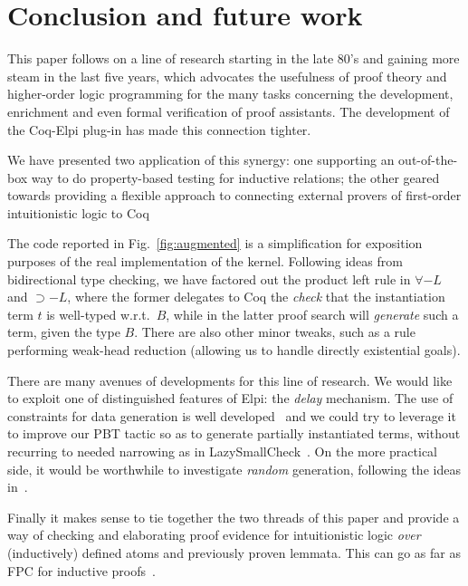 \section{Conclusion and future work}

This paper follows on a line of research starting in the late 80's and
gaining more steam in the last five years, which advocates the
usefulness of proof theory and higher-order logic programming for the
many tasks concerning the development, enrichment and even formal
verification of proof assistants. The development of the Coq-Elpi
plug-in has made this connection tighter.

We have presented two application of this synergy: one supporting an
out-of-the-box way to do property-based testing for inductive
relations; the other geared towards providing a flexible approach to
connecting external provers of first-order intuitionistic logic to Coq
%


 The
code reported in Fig.~\ref{fig:augmented} is a simplification for
exposition purposes of the real implementation of the
kernel. Following ideas from bidirectional type checking, we have
factored out the product left rule in $\forall-L$ and $\supset-L$,
where the former delegates to Coq the \emph{check} that the
instantiation term $t$ is well-typed w.r.t.~$B$, while in the latter
proof search will \emph{generate} such a term, given the type
$B$. There are also other minor tweaks, such as
a rule performing weak-head reduction (allowing
us to handle directly existential goals).

There are many avenues of developments for this line of research. 
We would like to exploit one of distinguished features of Elpi: the
\emph{delay} mechanism.  The use of constraints for data generation is
well developed~\cite{FioravantiPS15} and we could try to leverage it
to improve our PBT tactic so as to generate partially instantiated
terms, %
without recurring to needed narrowing as in
LazySmallCheck~\cite{smallcheck}. On the more practical side, it would
be worthwhile to investigate \emph{random} generation, following the
ideas in~\cite{pltredexconstraintlogic,blanco19ppdp}.


Finally it makes sense to tie together the two threads of this paper
and provide a way of checking and elaborating proof evidence for
intuitionistic logic \emph{over} (inductively) defined atoms and
previously proven lemmata. This can go as far as FPC for inductive
proofs~\cite{blanco15wof}.

